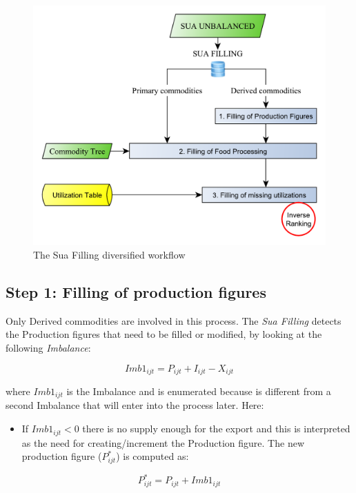 \documentclass[]{article}
\providecommand{\tightlist}{%
  \setlength{\itemsep}{0pt}\setlength{\parskip}{0pt}}
\begin{document}
\begin{figure}

{\centering \includegraphics[width=0.65\linewidth]{images/StandBal/04_SuaFilling2} 

}

\caption{\label{fig:f4}The Sua Filling diversified workflow}\label{fig:f4}
\end{figure}

\subsection*{Step 1: Filling of production
figures}\label{step-1-filling-of-production-figures}

Only Derived commodities are involved in this process. The \emph{Sua
Filling} detects the Production figures that need to be filled or
modified, by looking at the following \emph{Imbalance}:

\begin{equation}
\label{eq:imbalance1}
Imb1_{ijt} = P_{ijt} + I_{ijt} - X_{ijt}
\end{equation}

where \(Imb1_{ijt}\) is the Imbalance and is enumerated because is
different from a second Imbalance that will enter into the process
later. Here:

\begin{itemize}
\tightlist
\item
  If \(Imb1_{ijt} < 0\) there is no supply enough for the export and
  this is interpreted as the need for creating/increment the Production
  figure. The new production figure (\(P^*_{ijt}\)) is computed as:
\end{itemize}

\begin{equation}
\label{eq:imbalance1}
 P^*_{ijt} = P_{ijt} + Imb1_{ijt}
\end{equation}
\end{document}
